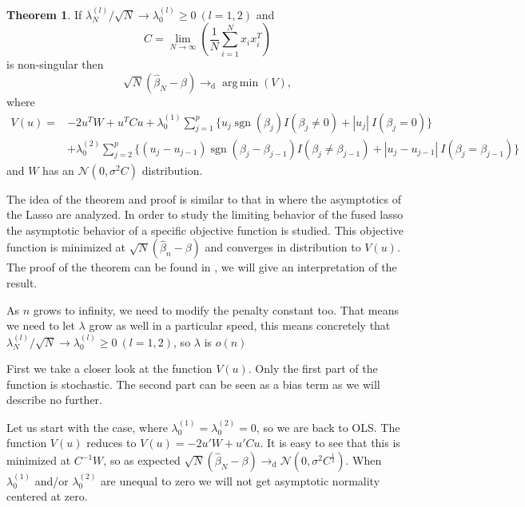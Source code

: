 \documentclass{article}
\theoremstyle{definition}
\newtheorem{theorem}{Theorem}
\DeclareMathOperator*{\argmin}{arg\,min}
\DeclareMathOperator*{\sgn}{sgn}
\begin{document}
\begin{theorem}
	If $\lambda_N^{(l)}/\sqrt{N} \rightarrow \lambda_0^{(l)} \geq 0 \  (l=1,2)$ and
	\begin{equation*}
		C = \lim\limits_{N \rightarrow \infty}{(\frac{1}{N} \sum_{i=1}^{N}x_i x_i^T)}
	\end{equation*}
	is non-singular then
	\begin{equation*}
		\sqrt{N}(\hat{\beta}_N - \beta) \rightarrow_{\text{d}} \argmin(V),
	\end{equation*}
	where
	\begin{align*}
		V(u) = &-2u^T W + u^T Cu + \lambda_0^{(1)} \sum_{j=1}^{p} \{u_j \sgn(\beta_j)I(\beta_j \neq 0) + |u_j|\ I(\beta_j=0) \} \\
		&+ \lambda_0^{(2)} \sum_{j=2}^{p} \{(u_j - u_{j-1}) \sgn(\beta_j - \beta_{j-1})I(\beta_j \neq \beta_{j-1}) + |u_j-u_{j-1}|\ I(\beta_j=\beta_{j-1}) \} 
	\end{align*}
and $W$ has an $\mathcal{N}(0,\sigma^2 C)$ distribution.
\end{theorem}

The idea of the theorem and proof is similar to that in \citep{asymptoticslasso} where the asymptotics of the Lasso are analyzed. In order to study the limiting behavior of the fused lasso the asymptotic behavior of a specific objective function is studied. This objective function is minimized at $\sqrt{N}(\hat{\beta}_n-\beta)$ and converges in distribution to $V(u)$. The proof of the theorem can be found in \citep{fused}, we will give an interpretation of the result.
\smallskip

\noindent As $n$ grows to infinity, we need to modify the penalty constant too. That means we need to let $\lambda$ grow as well in a particular speed, this means concretely that $\lambda_N^{(l)}/\sqrt{N} \rightarrow \lambda_0^{(l)} \geq 0 \  (l=1,2)$, so $\lambda$ is $o(n)$ 
\smallskip

\noindent First we take a closer look at the function $V(u)$. Only the first part of the function is stochastic. The second part can be seen as a bias term as we will describe no further.
\smallskip

\noindent Let us start with the case, where $\lambda_0^{(1)}= \lambda_0^{(2)} = 0$, so we are back to OLS. The function $V(u)$ reduces to $V(u) = -2u'W + u'Cu$. It is easy to see that this is minimized at $C^{-1}W$, so as expected 		$\sqrt{N}(\hat{\beta}_N - \beta) \rightarrow_{\text{d}} \mathcal{N}(0,\sigma^2 C^{\frac{1}{2}})$.
When $\lambda_0^{(1)}$ and/or $\lambda_0^{(2)}$ are unequal to zero we will not get asymptotic normality centered at zero.
\end{document}
